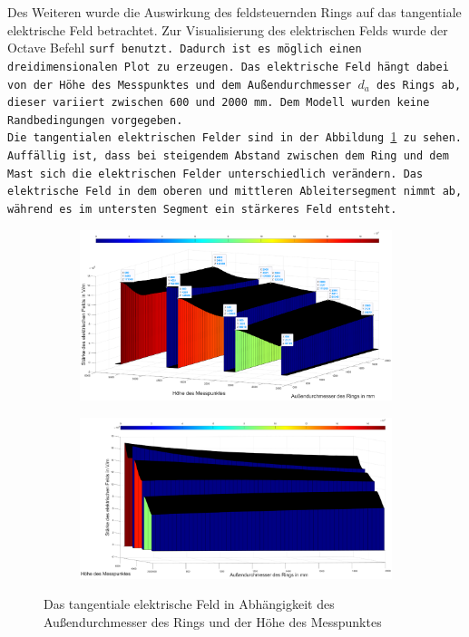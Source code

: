 \newpage

Des Weiteren wurde die Auswirkung des feldsteuernden Rings auf das tangentiale elektrische Feld betrachtet. Zur Visualisierung des elektrischen Felds wurde der Octave Befehl \tt{surf} benutzt. Dadurch ist es möglich einen dreidimensionalen Plot zu erzeugen. Das elektrische Feld hängt dabei von der Höhe des Messpunktes und dem Außendurchmesser $d_a$ des Rings ab, dieser variiert zwischen \SI{600}{} und \SI{2000}{\milli\meter}. Dem  Modell wurden keine Randbedingungen vorgegeben. \\
Die tangentialen elektrischen Felder sind in der Abbildung \ref{fig:3DTang} zu sehen. Auffällig ist, dass bei steigendem Abstand zwischen dem Ring und dem Mast sich die elektrischen Felder unterschiedlich verändern. Das elektrische Feld in dem oberen und mittleren Ableitersegment nimmt ab, während es im untersten Segment ein stärkeres Feld entsteht.
\begin{figure}[h]
	\begin{subfigure}[h]{\textwidth}
		\centering
		\includegraphics[width=\textwidth]{data/3DEtang}
	\end{subfigure}
	\begin{subfigure}[h]{\textwidth}
		\centering
		\includegraphics[width=\textwidth]{data/3DEtangVergleich}
	\end{subfigure}
\caption{Das tangentiale elektrische Feld in Abhängigkeit des Außendurchmesser des Rings und der Höhe des Messpunktes}
\label{fig:3DTang}
\end{figure}



